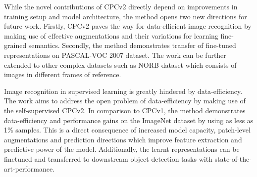\documentclass[11pt,letterpaper]{article}
\begin{document}
While the novel contributions of CPCv2 directly depend on improvements in training setup and model architecture, the method opens two new directions for future work. Firstly, CPCv2 paves the way for data-efficient image recognition by making use of effective augmentations and their variations for learning fine-grained semantics. Secondly, the method demonstrates transfer of fine-tuned representations on PASCAL-VOC 2007 dataset. The work can be further extended to other complex datasets such as NORB dataset which consists of images in different frames of reference. 

Image recognition in supervised learning is greatly hindered by data-efficiency. The work aims to address the open problem of data-efficiency by making use of the self-supervised CPCv2. In comparison to CPCv1, the method demonstrates data-efficiency and performance gains on the ImageNet dataset by using as less as 1\% samples. This is a direct consequence of increased model capacity, patch-level augmentations and prediction directions which improve feature extraction and predictive power of the model. Additionally, the learnt representations can be finetuned and transferred to downstream object detection tasks with state-of-the-art-performance.  
\end{document}
